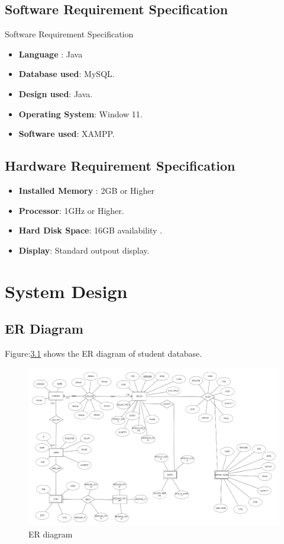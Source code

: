 \documentclass[12pt, letter paper]{report}
\begin{document}
\section{Software Requirement Specification}
Software Requirement Specification
\begin{itemize}
 \item {\textbf{Language} : Java}
 \item {\textbf{Database used}: MySQL}.
 \item {\textbf{Design used}: Java}.
 \item {\textbf{Operating System}: Window 11}.
 \item {\textbf{Software used}: XAMPP}.
\end{itemize}

\section{Hardware Requirement Specification} 

\begin{itemize}
 \item {\textbf{Installed Memory} : 2GB or Higher}
 \item {\textbf{Processor}: 1GHz or Higher}.
 \item {\textbf{Hard Disk Space}: 16GB availability }.
 \item {\textbf{Display}: Standard outpout display}.
 \
\end{itemize}
\chapter{System Design}
\section{ER Diagram} 
Figure:\ref{fig:er-diagram-for-student-management-system.png} shows the ER diagram of student database.
\begin{figure}[h]
 \centering
 \includegraphics[width=1\textwidth]{er-diagram-for-student-management-system.png}
 \caption{ER diagram}
 \label{fig:er-diagram-for-student-management-system.png}
\end{figure}
\\
\\
\\
\pagebreak
\end{document}

